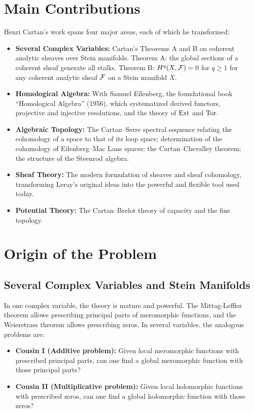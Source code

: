 \section{Main Contributions}

Henri Cartan's work spans four major areas, each of which he transformed:

\begin{itemize}
    \item \textbf{Several Complex Variables:} Cartan's Theorems A and B on coherent analytic sheaves over Stein manifolds. Theorem A: the global sections of a coherent sheaf generate all stalks. Theorem B: $H^q(X, \mathcal{F}) = 0$ for $q \geq 1$ for any coherent analytic sheaf $\mathcal{F}$ on a Stein manifold $X$.
    \item \textbf{Homological Algebra:} With Samuel Eilenberg, the foundational book ``Homological Algebra'' (1956), which systematized derived functors, projective and injective resolutions, and the theory of $\operatorname{Ext}$ and $\operatorname{Tor}$.
    \item \textbf{Algebraic Topology:} The Cartan--Serre spectral sequence relating the cohomology of a space to that of its loop space; determination of the cohomology of Eilenberg--Mac Lane spaces; the Cartan--Chevalley theorem; the structure of the Steenrod algebra.
    \item \textbf{Sheaf Theory:} The modern formulation of sheaves and sheaf cohomology, transforming Leray's original ideas into the powerful and flexible tool used today.
    \item \textbf{Potential Theory:} The Cartan--Brelot theory of capacity and the fine topology.
\end{itemize}

\section{Origin of the Problem}

\subsection{Several Complex Variables and Stein Manifolds}

In one complex variable, the theory is mature and powerful. The Mittag-Leffler theorem allows prescribing principal parts of meromorphic functions, and the Weierstrass theorem allows prescribing zeros. In several variables, the analogous problems are:

\begin{itemize}
    \item \textbf{Cousin I (Additive problem):} Given local meromorphic functions with prescribed principal parts, can one find a global meromorphic function with those principal parts?
    \item \textbf{Cousin II (Multiplicative problem):} Given local holomorphic functions with prescribed zeros, can one find a global holomorphic function with those zeros?
\end{itemize}

